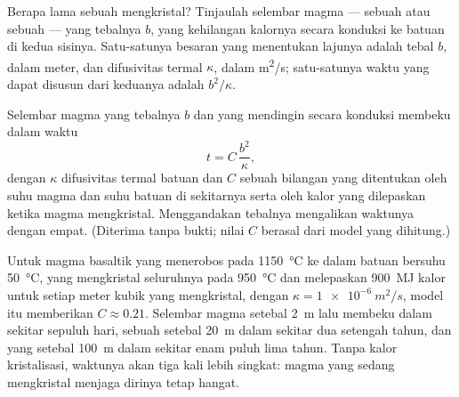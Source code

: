 Berapa lama sebuah  mengkristal? Tinjaulah selembar magma --- sebuah
 atau sebuah  --- yang tebalnya $b$, yang kehilangan kalornya secara
konduksi ke batuan di kedua sisinya. Satu-satunya besaran yang menentukan
lajunya adalah tebal $b$, dalam meter, dan difusivitas termal $\kappa$, dalam
\unit{m^2/s}; satu-satunya waktu yang dapat disusun dari keduanya adalah $b^2/\kappa$.

\begin{proposition}\label{prop:g11:igneous-rocks:cooling}
Selembar magma yang tebalnya $b$ dan yang mendingin secara konduksi membeku
dalam waktu
\[
  t = C\,\frac{b^2}{\kappa},
\]
dengan $\kappa$ difusivitas termal batuan dan $C$ sebuah bilangan yang
ditentukan oleh suhu magma dan suhu batuan di sekitarnya serta oleh kalor yang
dilepaskan ketika magma mengkristal. Menggandakan tebalnya mengalikan waktunya
dengan empat. (Diterima tanpa bukti; nilai $C$ berasal dari model yang
dihitung.)
\end{proposition}

Untuk magma basaltik yang menerobos pada \qty{1150}{\degreeCelsius} ke dalam
batuan bersuhu \qty{50}{\degreeCelsius}, yang mengkristal seluruhnya pada
\qty{950}{\degreeCelsius} dan melepaskan \qty{900}{MJ} kalor untuk setiap meter
kubik yang mengkristal, dengan $\kappa = \qty{1e-6}{m^2/s}$, model itu
memberikan $C \approx 0.21$. Selembar magma setebal \qty{2}{m} lalu membeku
dalam sekitar sepuluh hari, sebuah  setebal \qty{20}{m} dalam sekitar dua
setengah tahun, dan yang setebal \qty{100}{m} dalam sekitar enam puluh lima
tahun. Tanpa kalor kristalisasi, waktunya akan tiga kali lebih singkat: magma
yang sedang mengkristal menjaga dirinya tetap hangat.

